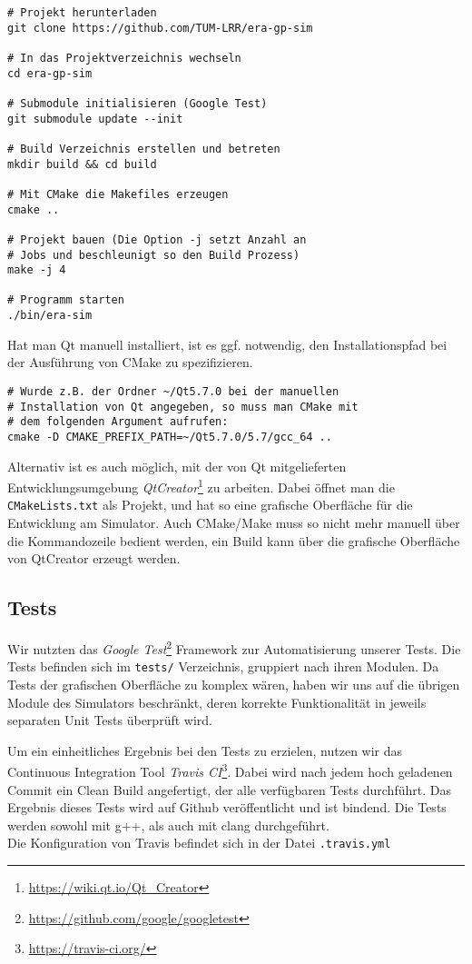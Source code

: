 \begin{lstlisting}
# Projekt herunterladen
git clone https://github.com/TUM-LRR/era-gp-sim

# In das Projektverzeichnis wechseln
cd era-gp-sim

# Submodule initialisieren (Google Test)
git submodule update --init

# Build Verzeichnis erstellen und betreten
mkdir build && cd build

# Mit CMake die Makefiles erzeugen
cmake ..

# Projekt bauen (Die Option -j setzt Anzahl an
# Jobs und beschleunigt so den Build Prozess)
make -j 4

# Programm starten
./bin/era-sim
\end{lstlisting}

Hat man Qt manuell installiert, ist es ggf. notwendig, den Installationspfad bei der
Ausführung von CMake zu spezifizieren.

\begin{lstlisting}
# Wurde z.B. der Ordner ~/Qt5.7.0 bei der manuellen
# Installation von Qt angegeben, so muss man CMake mit
# dem folgenden Argument aufrufen:
cmake -D CMAKE_PREFIX_PATH=~/Qt5.7.0/5.7/gcc_64 ..
\end{lstlisting}

Alternativ ist es auch möglich, mit der von Qt mitgelieferten Entwicklungsumgebung
\textit{QtCreator}\footnote{\url{https://wiki.qt.io/Qt_Creator}} zu arbeiten.
Dabei öffnet man die \texttt{CMakeLists.txt} als Projekt, und hat so eine grafische
Oberfläche für die Entwicklung am Simulator. Auch CMake/Make muss so nicht mehr
manuell über die Kommandozeile bedient werden, ein Build kann über die grafische
Oberfläche von QtCreator erzeugt werden.

\subsection{Tests}

Wir nutzten das \textit{Google Test}\footnote{\url{https://github.com/google/googletest}} Framework
zur Automatisierung unserer Tests. Die Tests befinden sich im \texttt{tests/} Verzeichnis, gruppiert
nach ihren Modulen. Da Tests der grafischen Oberfläche zu komplex wären, haben wir uns auf die übrigen
Module des Simulators beschränkt, deren korrekte Funktionalität in jeweils separaten Unit Tests
überprüft wird.

Um ein einheitliches Ergebnis bei den Tests zu erzielen, nutzen wir das Continuous Integration Tool
\textit{Travis CI}\footnote{\url{https://travis-ci.org/}}. Dabei wird nach jedem hoch geladenen
Commit ein Clean Build angefertigt, der alle verfügbaren Tests durchführt. Das Ergebnis dieses Tests
wird auf Github veröffentlicht und ist bindend. Die Tests werden sowohl mit g++, als auch mit clang
durchgeführt. \\
Die Konfiguration von Travis befindet sich in der Datei \texttt{.travis.yml}

